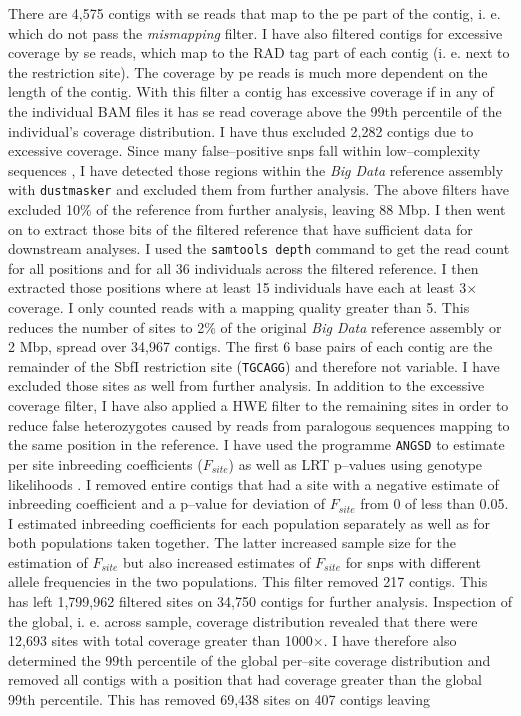 \documentclass[a4paper,12pt,times,print,index,custombib,custommargin]{PhDThesisPSnPDF}\usepackage[]{graphicx}\usepackage[]{color}
\begin{document}
There are 4,575 contigs with \gls{se} reads that map to the \gls{pe} part of the contig, i. e. which do not pass the \textit{mismapping} filter. I have also filtered \glspl{contig} for excessive coverage by \gls{se} reads, which map to the \gls{RAD tag} part of each contig (i. e. next to the restriction site). The coverage by \gls{pe} reads is much more dependent on the length of the contig. With this filter a contig has excessive coverage if in any of the individual BAM files it has \gls{se} read coverage above the 99th percentile of the individual's coverage distribution. I have thus excluded 2,282 contigs due to excessive coverage. Since many false--positive \glspl{snp} fall within low--complexity sequences \citep{Li2014}, I have detected those regions within the \emph{Big Data} reference assembly with \texttt{dustmasker} \citep{Morgulis2006} and excluded them from further analysis. The above filters have excluded 10\% of the reference from further analysis, leaving 88 \gls{Mbp}. %
I then went on to extract those bits of the filtered reference that have sufficient data for downstream analyses. I used the \texttt{samtools depth} command to get the read count for all positions and for all 36 individuals across the filtered reference. I then extracted those positions where at least 15 individuals have each at least 3$\times$ coverage. I only counted reads with a mapping quality greater than 5. This reduces the number of sites to 2\% of the original \emph{Big Data} reference assembly or 2 \gls{Mbp}, spread over 34,967 contigs. The first 6 base pairs of each contig are the remainder of the SbfI restriction site (\texttt{TGCAGG}) and therefore not variable. I have excluded those sites as well from further analysis. In addition to the excessive coverage filter, I have also applied a HWE filter to the remaining sites in order to reduce false heterozygotes caused by reads from paralogous sequences mapping to the same position in the reference. I have used the programme \texttt{ANGSD} \citep{Korneliussen2014} to estimate per site inbreeding coefficients ($F_{site}$) as well as LRT p--values using genotype likelihoods \citep{Vieira2013}. I removed entire contigs that had a site with a negative estimate of inbreeding coefficient and a p--value for deviation of $F_{site}$ from 0 of less than 0.05.  I estimated inbreeding coefficients for each population separately as well as for both populations taken together. The latter increased sample size for the estimation of $F_{site}$ but also increased estimates of $F_{site}$ for \glspl{snp} with different allele frequencies in the two populations. This filter removed 217 contigs. This has left 1,799,962 filtered sites on 34,750 contigs for further analysis. Inspection of the global, i. e. across sample, coverage distribution revealed that there were 12,693 sites with total coverage greater than 1000$\times$. I have therefore also determined the 99th percentile of the global per--site coverage distribution and removed all contigs with a position that had coverage greater than the global 99th percentile. This has removed 69,438 sites on 407 contigs leaving 
\end{document}
